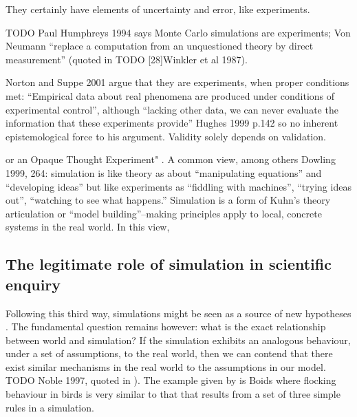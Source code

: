 
They certainly have elements of uncertainty and error, like experiments.

TODO Paul Humphreys 1994 says Monte Carlo simulations are experiments; Von
Neumann ``replace a computation from an unquestioned theory by direct
measurement'' (quoted in TODO [28]{Winkler et al 1987}).

Norton and Suppe 2001 argue that they are experiments, when proper conditions met:
``Empirical
data about real phenomena are produced under conditions of experimental
control'', although ``lacking other data, we can never evaluate the
information that these experiments provide'' Hughes 1999 p.142 so no inherent epistemological force to his
argument. Validity solely depends on validation.

\label{a-third-way-neither-experimental-or-theoretical}

\autocite[31]{Winsberg2010} or an Opaque Thought Experiment"
\autocite{DiPaolo2000}. A common view, among others Dowling 1999, 264:
simulation is like theory as about ``manipulating equations'' and
``developing ideas'' but like experiments as ``fiddling with machines'',
``trying ideas out'', ``watching to see what happens.'' Simulation is a
form of Kuhn's theory articulation or ``model building''--making
principles apply to local, concrete systems in the real world. In this
view, 

\subsection{The legitimate role of simulation in scientific
	enquiry}\label{the-legitimate-role-of-simulation-in-scientific-enquiry}

Following this third way, simulations might be seen as a source of new
hypotheses \autocite{Eldridge}. The fundamental question remains
however: what is the exact relationship between world and simulation? If
the simulation exhibits an analogous behaviour, under a set of
assumptions, to the real world, then we can contend that there exist
similar mechanisms in the real world to the assumptions in our model.
TODO Noble 1997, quoted in \autocite{Eldridge}). The example given by
\autocite{Eldridge} is Boids \autocite{Reynolds1987} where flocking behaviour in
birds is very similar to that that results from a set of three simple
rules in a simulation.

